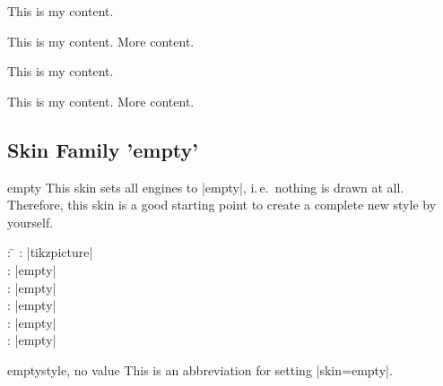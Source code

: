 \begin{dispExample}
\begin{tcbraster}[widget,skin=widgetlast,raster equal height,raster columns=4,
    colback=LightGreen,colframe=DarkGreen,
    left=1mm,right=1mm,top=1mm,bottom=1mm,middle=1mm]
  \begin{tcolorbox}
    This is my content.
  \end{tcolorbox}
  \begin{tcolorbox}
    This is my content.
    \tcblower
    More content.
  \end{tcolorbox}
  \begin{tcolorbox}[adjusted title=My title]
    This is my content.
  \end{tcolorbox}
  \begin{tcolorbox}[adjusted title=My title]
    This is my content.
    \tcblower
    More content.
  \end{tcolorbox}
\end{tcbraster}
\end{dispExample}




\clearpage
\subsection{Skin Family 'empty'}

\begin{docSkin}{empty}
  This skin sets all engines to |empty|, i.\,e.\ nothing is drawn at all.
  Therefore, this skin is a good starting point to create a complete
  new style by yourself.
\begin{tcolorbox}[skintable=empty]
  \begin{tabbing}
    : \=\kill
    :  \> |tikzpicture|\\ 
    :           \> |empty|\\
    : \> |empty|\\ 
    :        \> |empty|\\
    :    \> |empty|\\
    :           \> |empty|
  \end{tabbing}
\end{tcolorbox}
\end{docSkin}


\begin{docTcbKey}{empty}{}{style, no value}
  This is an abbreviation for setting |skin=empty|.
\end{docTcbKey}

